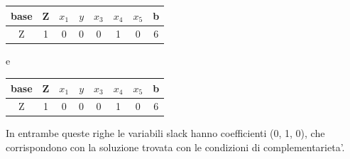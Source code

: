 \documentclass[a4paper,12pt,oneside]{article}
\begin{document}
    \begin{center}
        \begin{tabular}{||c c c c c c c c||}
            \hline
            base & Z & $x_1$ & $y$ & $x_3$ & $x_4$ & $x_5$ & b \\
            \hline
            \hline
            Z     & 1 & 0 & 0 & 0 &            1 &            0 &  6 \\
            \hline
        \end{tabular}
    \end{center}
    e
    \begin{center}
        \begin{tabular}{||c c c c c c c c||}
            \hline
            base & Z & $x_1$ & $y$ & $x_3$ & $x_4$ & $x_5$ & b \\
            \hline
            \hline
            Z     & 1 & 0 & 0 & 0 &            1 &            0 &  6 \\
            \hline
        \end{tabular}
    \end{center}

    In entrambe queste righe le variabili slack hanno coefficienti (0, 1, 0), che corrispondono con la soluzione trovata con le condizioni di complementarieta'.
\end{document}

